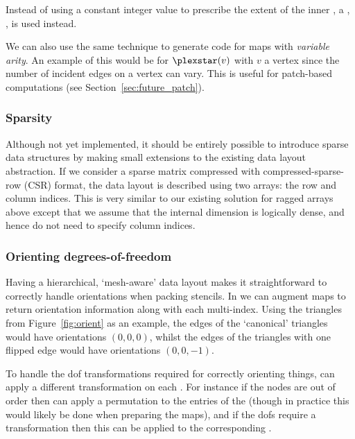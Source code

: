 Instead of using a constant integer value to prescribe the extent of the inner , a , , is used instead.

We can also use the same technique to generate code for maps with \textit{variable arity}.
An example of this would be for $\plexstar(v)$ with $v$ a vertex since the number of incident edges on a vertex can vary.
This is useful for patch-based computations (see Section~\ref{sec:future_patch}).

\subsubsection{Sparsity}
\label{sec:impl_datalayout_sparsity}

Although not yet implemented, it should be entirely possible to introduce sparse data structures by making small extensions to the existing data layout abstraction.
If we consider a sparse matrix compressed with compressed-sparse-row (CSR) format, the data layout is described using two arrays: the row and column indices.
This is very similar to our existing solution for ragged arrays above except that we assume that the internal dimension is logically dense, and hence do not need to specify column indices.

\subsubsection{Orienting degrees-of-freedom}
\label{sec:impl_orientation}


Having a hierarchical, `mesh-aware' data layout makes it straightforward to correctly handle orientations when packing stencils.
In  we can augment maps to return orientation information along with each multi-index.
Using the triangles from Figure~\ref{fig:orient} as an example, the edges of the `canonical' triangles would have orientations $(0,0,0)$, whilst the edges of the triangles with one flipped edge would have orientations $(0,0,-1)$.

To handle the \gls{dof} transformations required for correctly orienting things,  can apply a different transformation on each .
For instance if the nodes are out of order then  can apply a permutation to the entries of the  (though in practice this would likely be done when preparing the maps), and if the \glspl{dof} require a transformation then this can be applied to the corresponding .

